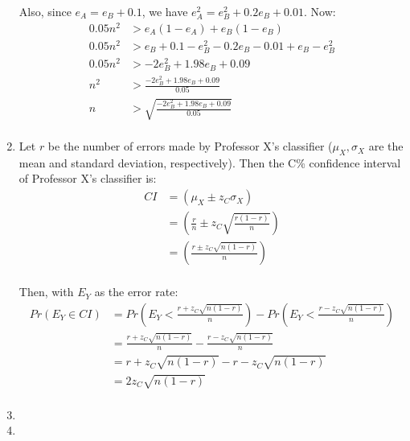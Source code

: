 \documentclass[12pt]{article}
\begin{document}
\begin{enumerate}
    Also, since $e_A=e_B+0.1$, we have $e_A^2=e_B^2+0.2e_B+0.01$. Now:
    \begin{equation}
      \begin{split}
        0.05n^2&>e_A\left(1-e_A\right)+e_B\left(1-e_B\right)\\
        0.05n^2&>e_B+0.1-e_B^2-0.2e_B-0.01+e_B-e_B^2\\
        0.05n^2&>-2e_B^2+1.98e_B+0.09\\
        n^2&>\frac{-2e_B^2+1.98e_B+0.09}{0.05}\\
        n&>\sqrt{\frac{-2e_B^2+1.98e_B+0.09}{0.05}}\\
      \end{split}
    \end{equation}
  \item
    Let $r$ be the number of errors made by Professor X's classifier
    ($\mu_X, \sigma_X$ are the mean and standard deviation, respectively). Then
    the C\% confidence interval of Professor X's classifier is:
    \begin{equation}
      \begin{split}
        CI&=\left(\mu_X\pm z_C\sigma_X\right)\\
        &=\left(\frac{r}{n}\pm z_C\sqrt{\frac{r\left(1-r\right)}{n}}\right)\\
        &=\left(\frac{r\pm z_C\sqrt{n\left(1-r\right)}}{n}\right)\\
      \end{split}
    \end{equation}

    Then, with $E_Y$ as the error rate:
    \begin{equation}
      \begin{split}
        Pr\left(E_Y\in CI\right)&
          =Pr\left(E_Y<\frac{r+z_C\sqrt{n\left(1-r\right)}}{n}\right)-
          Pr\left(E_Y<\frac{r-z_C\sqrt{n\left(1-r\right)}}{n}\right)\\
        &=\frac{r+z_C\sqrt{n\left(1-r\right)}}{n}-\frac{r-z_C\sqrt{n\left(1-r\right)}}{n}\\
        &=r+z_C\sqrt{n\left(1-r\right)}-r-z_C\sqrt{n\left(1-r\right)}\\
        &=2z_C\sqrt{n\left(1-r\right)}\\
      \end{split}
    \end{equation}
  \item
  \item
\end{enumerate}
\end{document}
